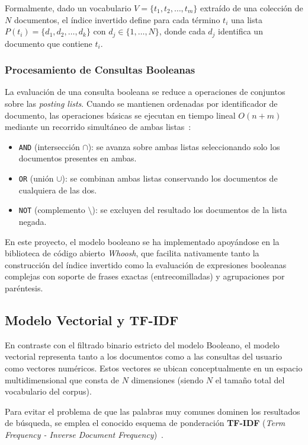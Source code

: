 \documentclass[conference,a4paper]{IEEEtran}
\begin{document}
Formalmente, dado un vocabulario $V = \{t_1, t_2, \ldots, t_m\}$ extraído de una colección de $N$ documentos, el índice invertido define para cada término $t_i$ una lista $P(t_i) = \{d_1, d_2, \ldots, d_k\}$ con $d_j \in \{1, \ldots, N\}$, donde cada $d_j$ identifica un documento que contiene $t_i$.

\subsubsection{Procesamiento de Consultas Booleanas}
La evaluación de una consulta booleana se reduce a operaciones de conjuntos sobre las \emph{posting lists}. Cuando se mantienen ordenadas por identificador de documento, las operaciones básicas se ejecutan en tiempo lineal $O(n + m)$ mediante un recorrido simultáneo de ambas listas~\cite{b4}:
\begin{itemize}
\item \texttt{AND} (intersección $\cap$): se avanza sobre ambas listas seleccionando solo los documentos presentes en ambas.
\item \texttt{OR} (unión $\cup$): se combinan ambas listas conservando los documentos de cualquiera de las dos.
\item \texttt{NOT} (complemento $\setminus$): se excluyen del resultado los documentos de la lista negada.
\end{itemize}

En este proyecto, el modelo booleano se ha implementado apoyándose en la biblioteca de código abierto \emph{Whoosh}, que facilita nativamente tanto la construcción del índice invertido como la evaluación de expresiones booleanas complejas con soporte de frases exactas (entrecomilladas) y agrupaciones por paréntesis.

\subsection{Modelo Vectorial y TF-IDF}

En contraste con el filtrado binario estricto del modelo Booleano, el modelo vectorial representa tanto a los documentos como a las consultas del usuario como vectores numéricos. Estos vectores se ubican conceptualmente en un espacio multidimensional que consta de $N$ dimensiones (siendo $N$ el tamaño total del vocabulario del corpus). 

Para evitar el problema de que las palabras muy comunes dominen los resultados de búsqueda, se emplea el conocido esquema de ponderación \textbf{TF-IDF} (\emph{Term Frequency - Inverse Document Frequency})~\cite{b5}.
\end{document}
